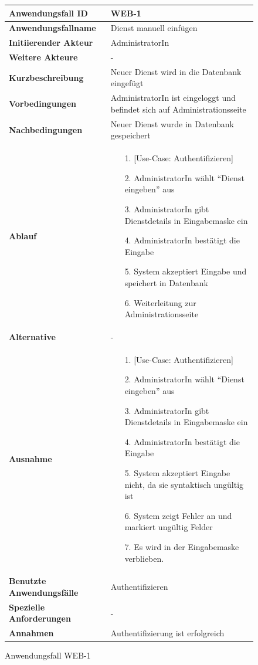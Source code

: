 \begin{figure}[h]
	\centering
	\begin{tabularx}{\textwidth}{ X | X }
		\textbf{Anwendungsfall ID} & WEB-1 \\ \hline
		\textbf{Anwendungsfallname} & Dienst manuell einfügen \\ \hline
		\textbf{Initiierender Akteur} & AdministratorIn \\ \hline
		\textbf{Weitere Akteure} & - \\ \hline
		\textbf{Kurzbeschreibung} & Neuer Dienst wird in die Datenbank eingefügt \\ \hline
		\textbf{Vorbedingungen} & AdministratorIn ist eingeloggt und befindet sich auf Administrationsseite \\ \hline
		\textbf{Nachbedingungen} & Neuer Dienst wurde in Datenbank gespeichert \\ \hline
		\textbf{Ablauf} &
		\begin{enumerate}
			\item [1.] [Use-Case: Authentifizieren]
			\item [2.] AdministratorIn wählt ``Dienst eingeben'' aus
			\item [3.] AdministratorIn gibt Dienstdetails in Eingabemaske ein
			\item [4.] AdministratorIn bestätigt die Eingabe
			\item [5.] System akzeptiert Eingabe und speichert in Datenbank
			\item [6.] Weiterleitung zur Administrationsseite
		\end{enumerate} \\ \hline
		\textbf{Alternative} & - \\ \hline
		\textbf{Ausnahme} &
		\begin{enumerate}
			\item [1.] [Use-Case: Authentifizieren]
			\item [2.] AdministratorIn wählt ``Dienst eingeben'' aus
			\item [3.] AdministratorIn gibt Dienstdetails in Eingabemaske ein
			\item [4.] AdministratorIn bestätigt die Eingabe
			\item [5.] System akzeptiert Eingabe nicht, da sie syntaktisch ungültig ist
			\item [6.] System zeigt Fehler an und markiert ungültig Felder
			\item [7.] Es wird in der Eingabemaske verblieben.
		\end{enumerate} \\ \hline
		\textbf{Benutzte Anwendungsfälle} & Authentifizieren \\ \hline
		\textbf{Spezielle Anforderungen} & - \\ \hline
		\textbf{Annahmen} & Authentifizierung ist erfolgreich
	\end{tabularx}
	\caption{Anwendungsfall WEB-1}
	\label{fig:anwendungsfall-server-tabelle-web-1}
\end{figure}


